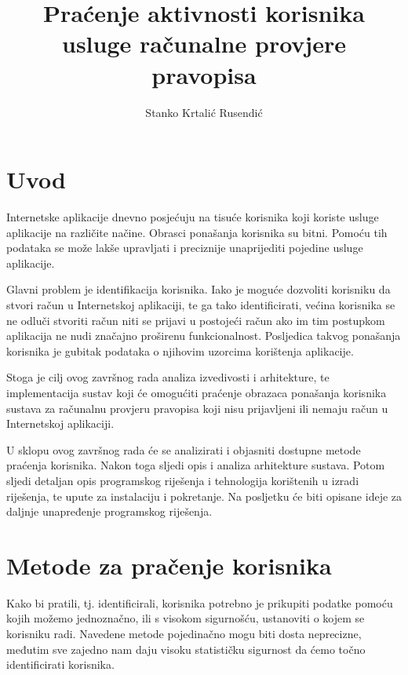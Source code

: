 \documentclass[times, utf8, zavrsni]{fer}
\begin{document}

\title{Praćenje aktivnosti korisnika usluge računalne provjere pravopisa}

\author{Stanko Krtalić Rusendić}

\maketitle


\zahvala{}

\tableofcontents

\chapter{Uvod}
Internetske aplikacije dnevno posjećuju na tisuće korisnika koji koriste
usluge aplikacije na različite načine. Obrasci ponašanja korisnika su bitni.
Pomoću tih podataka se može lakše upravljati i preciznije unaprijediti pojedine
usluge aplikacije.

Glavni problem je identifikacija korisnika. Iako je moguće dozvoliti korisniku
da stvori račun u Internetskoj aplikaciji, te ga tako identificirati, većina
korisnika se ne odluči stvoriti račun niti se prijavi u postojeći račun ako im
tim postupkom aplikacija ne nudi značajno proširenu funkcionalnost. Posljedica
takvog ponašanja korisnika je gubitak podataka o njihovim uzorcima korištenja
aplikacije.

Stoga je cilj ovog završnog rada analiza izvedivosti i arhitekture, te
implementacija sustav koji će omogućiti praćenje obrazaca ponašanja korisnika
sustava za računalnu provjeru pravopisa koji nisu prijavljeni ili nemaju račun u
Internetskoj aplikaciji.

U sklopu ovog završnog rada će se analizirati i objasniti dostupne metode
praćenja korisnika. Nakon toga sljedi opis i analiza arhitekture sustava.
Potom sljedi detaljan opis programskog riješenja i tehnologija korištenih u
izradi riješenja, te upute za instalaciju i pokretanje. Na posljetku će biti
opisane ideje za daljnje unapređenje programskog riješenja.

\chapter{Metode za pračenje korisnika}
Kako bi pratili, tj. identificirali, korisnika potrebno je prikupiti podatke
pomoću kojih možemo jednoznačno, ili s visokom sigurnošću, ustanoviti o kojem
se korisniku radi. Navedene metode pojedinačno mogu biti dosta neprecizne,
međutim sve zajedno nam daju visoku statističku sigurnost da ćemo točno
identificirati korisnika.
\end{document}
